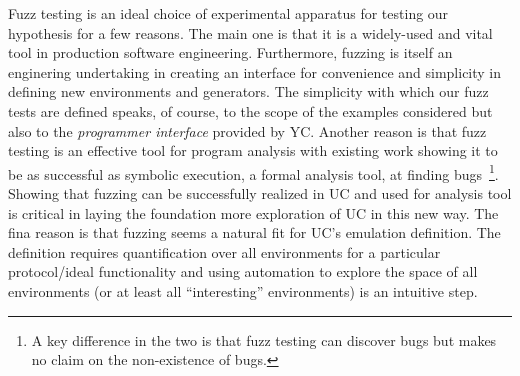 Fuzz testing is an ideal choice of experimental apparatus for testing our hypothesis for a few reasons.
The main one is that it is a widely-used and vital tool in production software engineering.
Furthermore, fuzzing is itself an enginering undertaking in creating an interface for convenience and simplicity in defining new environments and generators.
The simplicity with which our fuzz tests are defined speaks, of course, to the scope of the examples considered but also to the \emph{programmer interface} provided by YC.
Another reason is that fuzz testing is an effective tool for program analysis with existing work showing it to be as successful as symbolic execution, a formal analysis tool, at finding bugs~\cite{vitation1}\footnote{A key difference in the two is that fuzz testing can discover bugs but makes no claim on the non-existence of bugs.}.
Showing that fuzzing can be successfully realized in UC and used for analysis tool is critical in laying the foundation more exploration of UC in this new way.
The fina reason is that fuzzing seems a natural fit for UC's emulation definition. The definition requires quantification over all environments for a particular protocol/ideal functionality and using automation to explore the space of all environments (or at least all ``interesting'' environments) is an intuitive step.

